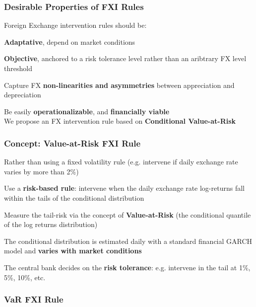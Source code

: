 \documentclass{beamer}
\newenvironment{largeitemize}{\itemize\addtolength{\itemsep}{10pt}}{\enditemize}
\begin{document}
\begin{frame}
  \frametitle{Desirable Properties of FXI Rules}
  Foreign Exchange intervention rules should be:\\
  \medskip  
  \begin{largeitemize}
  \item \textbf{Adaptative}, depend on market conditions
  \item \textbf{Objective}, anchored to a risk tolerance level
    rather than an aribtrary FX level threshold
  \item Capture FX \textbf{non-linearities and asymmetries} between appreciation and
    depreciation
  \item Be easily \textbf{operationalizable}, and \textbf{financially viable}\\
  \end{largeitemize}
\medskip  
We propose an FX intervention rule based on \textbf{Conditional Value-at-Risk}  
\end{frame}

\begin{frame}
  \frametitle{Concept: Value-at-Risk FXI Rule}
  \begin{largeitemize}
    \item Rather than using a fixed volatility rule (e.g. intervene if daily
      exchange rate varies by more than 2\%)
    \item Use a \textbf{risk-based rule}: intervene when the daily exchange
      rate log-returns fall within the
      tails of the conditional distribution
    \item Measure the tail-risk via the concept of \textbf{Value-at-Risk} (the
      conditional quantile of the log returns distribution) 
    \item The conditional distribution is estimated daily with a standard
      financial GARCH model and \textbf{varies with market conditions}
    \item The central bank decides on the \textbf{risk tolerance}:
      e.g. intervene in the tail at 1\%, 5\%, 10\%, etc.
  \end{largeitemize}
\end{frame}

\begin{frame}
  \frametitle{VaR FXI Rule}
\end{frame}
\end{document}
